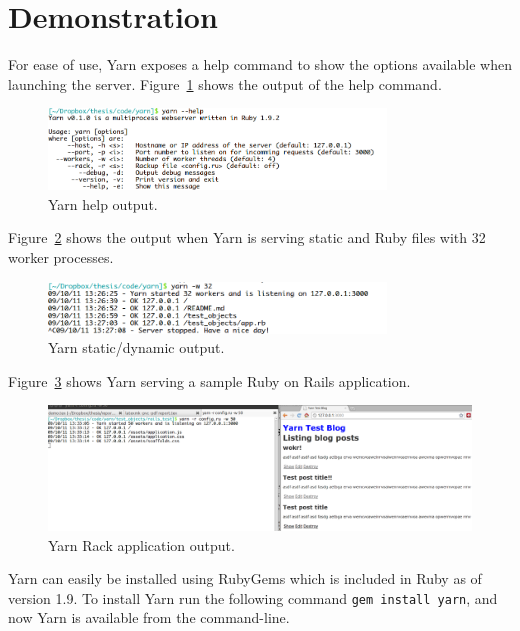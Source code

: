 \section{Demonstration}
For ease of use, Yarn exposes a help command to show the options available
when launching the server. Figure~\ref{screenshot} shows the output of the
help command.

\begin{figure}[htb]
  \centering
  \includegraphics[width=0.8\textwidth]{img/screenshot.png}
  \caption{Yarn help output.}
  \label{screenshot}
\end{figure}

Figure~\ref{screenshot2} shows the output when Yarn is serving static and Ruby
files with 32 worker processes.

\begin{figure}[htb]
  \centering
  \includegraphics[width=0.8\textwidth]{img/scr2.png}
  \caption{Yarn static/dynamic output.}
  \label{screenshot2}
\end{figure}

Figure~\ref{screenshot3} shows Yarn serving a sample Ruby on Rails
application.

\begin{figure}[htb]
  \centering
  \includegraphics[width=1.0\textwidth]{img/scr3.png}
  \caption{Yarn Rack application output.}
  \label{screenshot3}
\end{figure}

Yarn can easily be installed using RubyGems which is included in Ruby as of
version 1.9. To install Yarn run the following command \texttt{gem install
  yarn}, and now Yarn is available from the command-line. 

